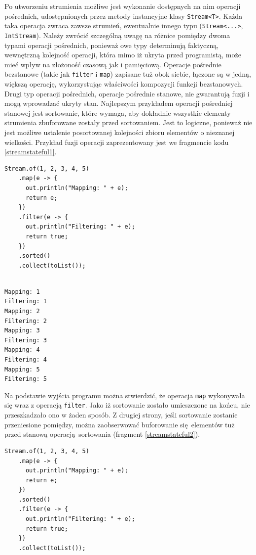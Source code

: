 \documentclass[12pt]{extarticle}
\begin{document}
    Po utworzeniu strumienia możliwe jest wykonanie dostępnych na nim operacji pośrednich, udostępnionych przez metody instancyjne klasy \texttt{Stream<T>}. Każda taka operacja zwraca zawsze strumień, ewentualnie innego typu (\texttt{Stream<...>}, \texttt{IntStream}). Należy zwrócić szczególną uwagę na różnice pomiędzy dwoma typami operacji pośrednich, ponieważ owe typy determinują faktyczną, wewnętrzną kolejność operacji, która mimo iż ukryta przed programistą, może mieć wpływ na złożoność czasową jak i pamięciową. Operacje pośrednie bezstanowe (takie jak \texttt{filter} i \texttt{map}) zapisane tuż obok siebie, łączone są w jedną, większą operację, wykorzystując właściwości kompozycji funkcji bezstanowych. Drugi typ operacji pośrednich, operacje pośrednie stanowe, nie gwarantują fuzji i mogą wprowadzać ukryty stan. Najlepszym przykładem operacji pośredniej stanowej jest sortowanie, które wymaga, aby dokładnie wszystkie elementy strumienia zbuforowane zostały przed sortowaniem. Jest to logiczne, ponieważ nie jest możliwe ustalenie posortowanej kolejności zbioru elementów o nieznanej wielkości. Przykład fuzji operacji zaprezentowany jest we fragmencie kodu \ref{streamstateful1}.

\begin{lstlisting}[label=streamstateful1, caption=Fuzja operacji bezstanowych]
Stream.of(1, 2, 3, 4, 5)
    .map(e -> {
      out.println("Mapping: " + e);
      return e;
    })
    .filter(e -> {
      out.println("Filtering: " + e);
      return true;
    })
    .sorted()
    .collect(toList());

\end{lstlisting}


\begin{verbatim}

Mapping: 1
Filtering: 1
Mapping: 2
Filtering: 2
Mapping: 3
Filtering: 3
Mapping: 4
Filtering: 4
Mapping: 5
Filtering: 5

\end{verbatim}

    Na podstawie wyjścia programu można stwierdzić, że operacja \texttt{map} wykonywała się wraz z operacją \texttt{filter}. Jako iż sortowanie zostało umieszczone na końcu, nie przeszkadzało ono w żaden sposób. Z drugiej strony, jeśli sortowanie zostanie przeniesione pomiędzy, można zaobserwować buforowanie się elementów tuż przed stanową operacją sortowania (fragment \ref{streamstateful2}).

\begin{lstlisting}[label=streamstateful2, caption=Brak fuzji operacji stanowych]
Stream.of(1, 2, 3, 4, 5)
    .map(e -> {
      out.println("Mapping: " + e);
      return e;
    })
    .sorted()
    .filter(e -> {
      out.println("Filtering: " + e);
      return true;
    })
    .collect(toList());
\end{lstlisting}
\end{document}
